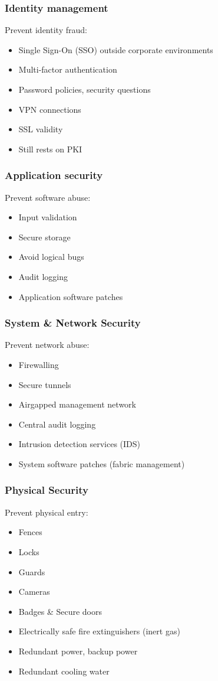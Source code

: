 \documentclass{beamer}
\begin{document}
\begin{frame}
    \frametitle{Identity management}
    Prevent identity fraud:
    \begin{itemize}
      \item Single Sign-On (SSO) outside corporate environments %
      \item Multi-factor authentication
      \item Password policies, security questions
      \item VPN connections
      \item SSL validity
      \item Still rests on PKI
    \end{itemize}
\end{frame}

\begin{frame}
    \frametitle{Application security}
    Prevent software abuse:
    \begin{itemize}
      \item Input validation
      \item Secure storage
      \item Avoid logical bugs
      \item Audit logging
      \item Application software patches
    \end{itemize}
\end{frame}

\begin{frame}
    \frametitle{System \& Network Security}
    Prevent network abuse:
    \begin{itemize}
      \item Firewalling
      \item Secure tunnels %
      \item Airgapped management network
      \item Central audit logging
      \item Intrusion detection services (IDS)
      \item System software patches (fabric management)
    \end{itemize}
\end{frame}

\begin{frame}
    \frametitle{Physical Security}
    Prevent physical entry:
    \begin{itemize}
      \item Fences
      \item Locks
      \item Guards
      \item Cameras
      \item Badges \& Secure doors
      \item Electrically safe fire extinguishers (inert gas)
      \item Redundant power, backup power
      \item Redundant cooling water
    \end{itemize}
\end{frame}
\end{document}
